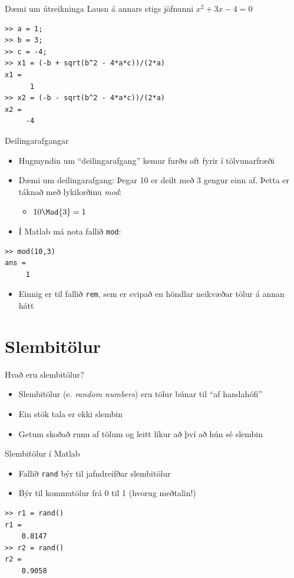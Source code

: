 \documentclass{beamer}
\begin{document}
\begin{frame}{Dæmi um útreikninga}
\vspace{1cm}
Lausn á annars stigs jöfnunni $x^2 + 3x - 4 = 0$
\begin{verbatim}
>> a = 1;
>> b = 3;
>> c = -4;
>> x1 = (-b + sqrt(b^2 - 4*a*c))/(2*a)
x1 =
      1
>> x2 = (-b - sqrt(b^2 - 4*a*c))/(2*a)
x2 =
     -4
\end{verbatim}
\end{frame}

\begin{frame}[fragile]{Deilingarafgangar}
\begin{itemize}
 \item Hugmyndin um ``deilingarafgang'' kemur furðu oft fyrir í tölvunarfræði
 \item Dæmi um deilingarafgang: Þegar 10 er deilt með 3 gengur einn af. Þetta er táknað með lykilorðinu \emph{mod}:
 \begin{itemize}
  \item $10 \Mod{3} = 1$
 \end{itemize}
 \item Í Matlab má nota fallið \texttt{mod}:
\end{itemize}
\begin{verbatim}
>> mod(10,3)
ans =
     1
\end{verbatim}
\begin{itemize}
 \item Einnig er til fallið \texttt{rem}, sem er svipað en höndlar neikvæðar tölur á annan hátt
\end{itemize}
\end{frame}

\section{Slembitölur}

\begin{frame}{Hvað eru slembitölur?}
\begin{itemize}
 \item Slembitölur (e. \emph{random numbers}) eru tölur búnar til ``af handahófi''
 \item Ein stök tala er ekki slembin
 \item Getum skoðað runu af tölum og leitt líkur að því að hún sé slembin
\end{itemize}
\end{frame}

\begin{frame}[fragile]{Slembitölur í Matlab}
\begin{itemize}
 \item Fallið \texttt{rand} býr til jafndreifðar slembitölur
 \item Býr til kommutölur frá 0 til 1 (hvorug meðtalin!)
\end{itemize}
\begin{verbatim}
>> r1 = rand()
r1 =
    0.8147
>> r2 = rand()
r2 =
    0.9058
\end{verbatim}
\end{frame}
\end{document}
